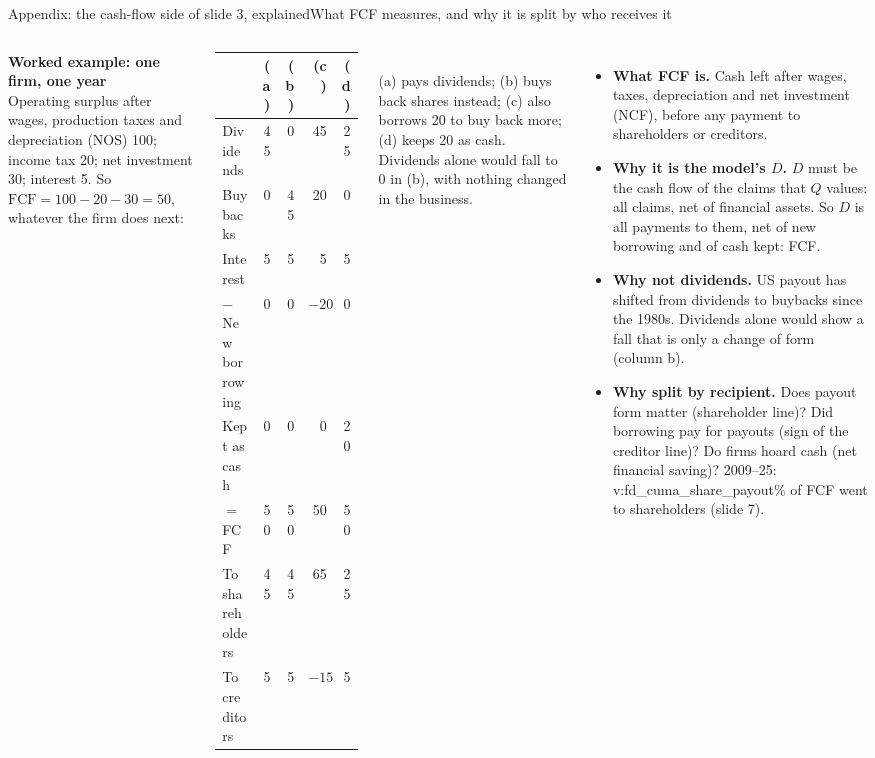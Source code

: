 \documentclass[aspectratio=169,10pt,t]{beamer}
\newcommand{\val}[1]{\csname v:#1\endcsname}
\begin{document}
\begin{frame}[label=xcash]{Appendix: the cash-flow side of slide 3, explained}{What FCF measures, and why it is split by who receives it}
\vspace{-0.15cm}
\begin{columns}[T]
{\scriptsize\textbf{Worked example: one firm, one year}\\[0.05cm]
Operating surplus after wages, production taxes and depreciation (NOS) 100; income tax 20; net investment 30; interest 5. So $\mathrm{FCF}=100-20-30=50$, whatever the firm does next:\\[0.08cm]
\setlength{\tabcolsep}{4pt}
\begin{tabular}{@{}lrrrr@{}}\toprule
 & (a) & (b) & (c) & (d)\\\midrule
Dividends & 45 & 0 & 45 & 25\\
Buybacks & 0 & 45 & 20 & 0\\
Interest & 5 & 5 & 5 & 5\\
$-$ New borrowing & 0 & 0 & $-20$ & 0\\
Kept as cash & 0 & 0 & 0 & 20\\\midrule
$=$ FCF & 50 & 50 & 50 & 50\\\midrule
To shareholders & 45 & 45 & 65 & 25\\
To creditors & 5 & 5 & $-15$ & 5\\\bottomrule
\end{tabular}\\[0.08cm]
(a) pays dividends; (b) buys back shares instead; (c) also borrows 20 to buy back more; (d) keeps 20 as cash. Dividends alone would fall to 0 in (b), with nothing changed in the business.\par}
{\scriptsize
\begin{itemize}\setlength{\itemsep}{0.07cm}
\item \textbf{What FCF is.} Cash left after wages, taxes, depreciation and net investment (NCF), before any payment to shareholders or creditors.
\item \textbf{Why it is the model's $D$.} $D$ must be the cash flow of the claims that $Q$ values: all claims, net of financial assets. So $D$ is all payments to them, net of new borrowing and of cash kept: FCF.
\item \textbf{Why not dividends.} US payout has shifted from dividends to buybacks since the 1980s. Dividends alone would show a fall that is only a change of form (column b).
\item \textbf{Why split by recipient.} Does payout form matter (shareholder line)? Did borrowing pay for payouts (sign of the creditor line)? Do firms hoard cash (net financial saving)? 2009--25: \val{fd_cuma_share_payout}\% of FCF went to shareholders (slide 7).

\end{itemize}}
\end{columns}
\end{frame}
\end{document}
